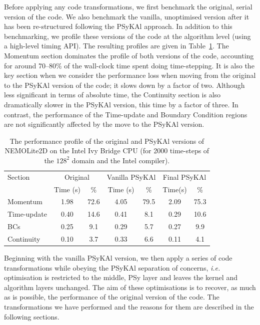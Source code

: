 \documentclass[gmd, manuscript]{copernicus}
\begin{document}
Before applying any code transformations, we first benchmark the
original, serial version of the code. We also benchmark the vanilla,
unoptimised version after it has been re-structured following the
{PS}y{KA}l approach. In addition to this benchmarking, we profile these
versions of the code at the algorithm level (using a high-level timing
API). The resulting profiles are given in
Table~\ref{TABLE_profile}. The Momentum section dominates the profile
of both versions of the code, accounting for around 70--80\% of the
wall-clock time spent doing time-stepping. It is also the key section
when we consider the performance loss when moving from the original to
the {PS}y{KA}l version of the code; it slows down by a factor of
two. Although less significant in terms of absolute time, the
Continuity section is also dramatically slower in the {PS}y{KA}l version,
this time by a factor of three. In contrast, the performance of the
Time-update and Boundary Condition regions are not significantly
affected by the move to the {PS}y{KA}l version.

\begin{table}[!t]
\caption{The performance profile of the original and {PS}y{KA}l versions
  of NEMOLite2D on the Intel Ivy Bridge CPU (for 2000 time-steps of the
  $128^{2}$ domain and the Intel compiler).}
\label{TABLE_profile}
\centering
\begin{tabular}{l|c|c|c|c|c|c}
\hline
Section & \multicolumn{2}{c|}{Original} & \multicolumn{2}{c|}{Vanilla {PS}y{KA}l} &
\multicolumn{2}{c}{Final {PS}y{KA}l} \\
        & Time (s) & \%  & Time (s) & \%  & Time(s) & \% \\
\hline
Momentum    & 1.98  & 72.6  & 4.05  & 79.5 & 2.09 & 75.3 \\
Time-update & 0.40  & 14.6  & 0.41  & 8.1  & 0.29 & 10.6 \\
BCs         & 0.25  & 9.1   & 0.29  & 5.7  & 0.27 & 9.9  \\
Continuity  & 0.10  & 3.7   & 0.33  & 6.6  & 0.11 & 4.1  \\
\hline
\end{tabular}
\end{table}

Beginning with the vanilla {PS}y{KA}l version, we then apply a series of
code transformations while obeying the {PS}y{KA}l separation of concerns,
\textit{i.e.} optimisation is restricted to the middle, {PS}y layer and
leaves the kernel and algorithm layers unchanged. The aim of these
optimisations is to recover, as much as is possible, the performance
of the original version of the code. The transformations we have
performed and the reasons for them are described in the following sections.
\end{document}
